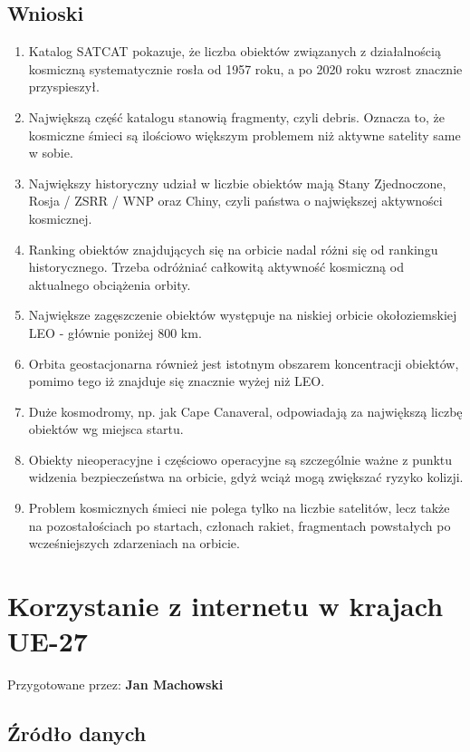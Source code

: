 \documentclass[12pt]{article}
\begin{document}
\subsection{Wnioski}
\begin{enumerate}
    \item Katalog SATCAT pokazuje, że liczba obiektów związanych z działalnością kosmiczną systematycznie rosła od 1957 roku, a po 2020 roku wzrost znacznie przyspieszył.
    \item Największą część katalogu stanowią fragmenty, czyli debris. Oznacza to, że kosmiczne śmieci są ilościowo większym problemem niż aktywne satelity same w sobie.
    \item Największy historyczny udział w liczbie obiektów mają Stany Zjednoczone, Rosja / ZSRR / WNP oraz Chiny, czyli państwa o największej aktywności kosmicznej.
    \item Ranking obiektów znajdujących się na orbicie nadal różni się od rankingu historycznego. Trzeba odróżniać całkowitą aktywność kosmiczną od aktualnego obciążenia orbity.
    \item Największe zagęszczenie obiektów występuje na niskiej orbicie okołoziemskiej LEO - głównie poniżej 800 km.
    \item Orbita geostacjonarna również jest istotnym obszarem koncentracji obiektów, pomimo tego iż znajduje się znacznie wyżej niż LEO.
    \item Duże kosmodromy, np. jak Cape Canaveral, odpowiadają za największą liczbę obiektów wg miejsca startu.
    \item Obiekty nieoperacyjne i częściowo operacyjne są szczególnie ważne z punktu widzenia bezpieczeństwa na orbicie, gdyż wciąż mogą zwiększać ryzyko kolizji.
    \item Problem kosmicznych śmieci nie polega tylko na liczbie satelitów, lecz także na pozostałościach po startach, członach rakiet, fragmentach powstałych po wcześniejszych zdarzeniach na orbicie.
\end{enumerate}


\section{Korzystanie z internetu w krajach UE-27}

Przygotowane przez: \textbf{Jan Machowski}

\subsection{Źródło danych}
\end{document}
